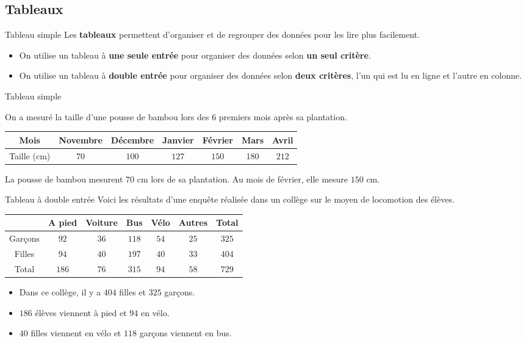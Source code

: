 \begin{pageCours} 

\section{Tableaux}

\begin{DefT}{Tableau simple}
Les \textbf{tableaux} permettent d'organiser et de regrouper des données pour les lire plus facilement.
\begin{itemize}
\item On utilise un tableau à \textbf{une seule entrée} pour organiser des données selon \textbf{un seul critère}.
\item On utilise un tableau à \textbf{double entrée} pour organiser des données selon \textbf{deux critères}, l'un qui est lu en ligne et l'autre en colonne.
\end{itemize}
\end{DefT}


\begin{Ex}{Tableau simple}

On a mesuré la taille d'une pousse de bambou lors des 6 premiers mois après sa plantation.
 \begin{center}
 \begin{tabular}{|c|c|c|c|c|c|c|} 
  \hline
  Mois & Novembre & Décembre & Janvier  & Février & Mars & Avril \\
  \hline
  Taille (cm) & $70$ & $100$ & $127$ & $150$ & $180$ & $212$  \\
  \hline
 \end{tabular}
 \end{center}

La pousse de bambou mesurent $70$ cm lors de sa plantation. Au mois de février, elle mesure $150$ cm.
\end{Ex}


\begin{Ex}{Tableau à double entrée}
Voici les résultats d'une enquête réalisée dans un collège sur le moyen de locomotion des élèves.
 \begin{center}
 \begin{tabular}{|c|c|c|c|c|c|c|}
  & A pied & Voiture & Bus &  Vélo & Autres & Total \\  \hline
  Garçons & $92$ & $36$ & $118$ & $54$ & $25$ & $325$  \\\hline
  Filles &  $94$ & $40$ & $197$ & $40$ & $33$ & $404$ \\\hline
  Total & $186$ & $76$ & $315$& $94$ & $58$ & $729$ \\
 \end{tabular}
 \end{center}
 \begin{itemize}
 \item Dans ce collège, il y a $404$ filles et $325$ garçons.
 \item $186$ élèves viennent à pied et $94$ en vélo.
 \item $40$ filles viennent en vélo et $118$ garçons viennent en bus.
\end{itemize}
\end{Ex}




\end{pageCours}
